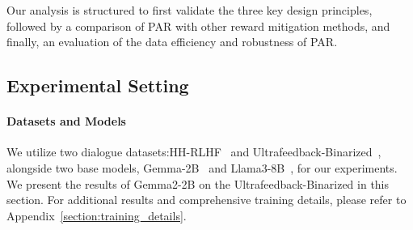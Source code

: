 Our analysis is structured to first validate the three key design principles, followed by a comparison of PAR with other reward mitigation methods, and finally, an evaluation of the data efficiency and robustness of PAR.

\subsection{Experimental Setting}
\paragraph{Datasets and Models}
We utilize two dialogue datasets:HH-RLHF~\citep{bai2022traininghelpfulharmlessassistant} and Ultrafeedback-Binarized~\citep{cui2023ultrafeedback}, alongside two base models, Gemma-2B~\citep{gemma_2024} and Llama3-8B~\citep{llama3modelcard}, for our experiments. We present the results of Gemma2-2B on the Ultrafeedback-Binarized in this section. For additional results and comprehensive training details, please refer to Appendix~\ref{section:training_details}. 
